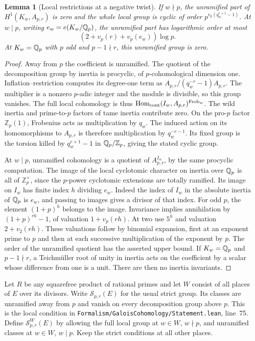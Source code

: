 \documentclass[a4paper,11pt]{article}
\newtheorem{lemma}[proposition]{Lemma}
\theoremstyle{definition}
\theoremstyle{remark}
\newcommand{\ZZ}{\mathbb Z}\newcommand{\ord}{\operatorname{ord}}
\newcommand{\Frob}{\operatorname{Frob}}\newcommand{\Gal}{\operatorname{Gal}}
\newcommand{\srcloc}[2]{{\small\nolinkurl{#1.lean}}, line~#2}
\numberwithin{equation}{section}
\newcommand{\Sel}{\mathcal S}
\begin{document}
\begin{lemma}[Local restrictions at a negative twist]
\label{lem:loc183}
If \(w\nmid p\), the unramified part of \(H^1(K_w,A_{p,r})\)
is zero and the whole local group is cyclic of order
\(p^{v_p(q_w^{r+1}-1)}\). At \(w\mid p\), writing
\(e_w=e(K_w/\mathbb Q_p)\), the unramified part has logarithmic
order at most
\[
        (2+v_p(r)+v_p(e_w))\log p .
\]
At \(K_w=\mathbb Q_p\) with \(p\) odd and \(p-1\nmid r\),
this unramified group is zero.
\end{lemma}
\begin{proof}
Away from \(p\) the coefficient is unramified.
The quotient of the decomposition group by inertia is
procyclic, of \(p\)-cohomological dimension one.
Inflation--restriction computes its degree-one term as
\(A_{p,r}/(q_w^{-r}-1)A_{p,r}\). The multiplier is a
nonzero \(p\)-adic integer and the module is divisible,
so this group vanishes. The full local cohomology is
thus \(\operatorname{Hom}_{\rm cont}(I_w,A_{p,r})^{\Frob_w}\).
The wild inertia and prime-to-\(p\) factors of tame inertia
contribute zero. On the pro-\(p\) factor \(\ZZ_p(1)\),
Frobenius acts as multiplication by \(q_w\). The induced
action on its homomorphisms to \(A_{p,r}\) is therefore
multiplication by \(q_w^{-r-1}\). Its fixed group is the
torsion killed by \(q_w^{r+1}-1\) in \(\QQ_p/\ZZ_p\), giving
the stated cyclic group.

At \(w\mid p\), unramified cohomology is a quotient of
\(A_{p,r}^{I_w}\), by the same procyclic computation.
The image of the local cyclotomic character on inertia
over \(\mathbb Q_p\) is all of \(\ZZ_p^\times\), since the
\(p\)-power cyclotomic extensions are totally ramified.
Its image on \(I_w\) has finite index \(h\) dividing \(e_w\).
Indeed the index of \(I_w\) in the absolute inertia of
\(\mathbb Q_p\) is \(e_w\), and passing to images gives a
divisor of that index. For odd \(p\), the element
\((1+p)^h\) belongs to the image. Invariance implies
annihilation by \((1+p)^{rh}-1\), of valuation
\(1+v_p(rh)\). At two use \(5^h\) and valuation
\(2+v_2(rh)\). These valuations follow by binomial
expansion, first at an exponent prime to \(p\) and then
at each successive multiplication of the exponent by \(p\).
The order of the unramified quotient has the asserted
upper bound. If \(K_w=\mathbb Q_p\) and \(p-1\nmid r\), a
Teichm\"uller root of unity in inertia acts on the coefficient
by a scalar whose difference from one is a unit. There
are then no inertia invariants.
\end{proof}

Let \(R\) be any squarefree product of rational primes
and let \(W\) consist of all places of \(E\) over its
divisors. Write \(\Sel_{p,r}(E)\) for the usual strict
group. Its classes are unramified away from \(p\) and
vanish on every decomposition group above \(p\). This is
the local condition in
\srcloc{Formalism/GaloisCohomology/Statement}{75}.
Define \(\Sel_{p,r}^{W}(E)\) by allowing the full local
group at \(w\in W\), \(w\nmid p\), and unramified classes
at \(w\in W\), \(w\mid p\). Keep the strict conditions
at all other places.
\end{document}
